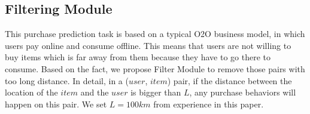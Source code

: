 \documentclass{llncs}
\begin{document}
\subsection{Filtering Module}
This purchase prediction task is based on a typical O2O business model,
in which users pay online and consume offline.
This means that users are not willing to buy items
which is far away from them because they have to go there to consume.
Based on the fact, we propose Filter Module to remove those pairs with too long distance.
In detail, in a ($user$, $item$) pair,
if the distance between the location of the $item$ and the $user$ is bigger than $L$,
any purchase behaviors will happen on this pair.
We set $L = 100km$ from experience in this paper.





\end{document}
